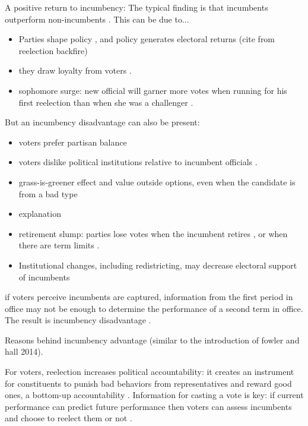\documentclass[12pt]{amsart}
\numberwithin{equation}{section}
\theoremstyle{definition}
\theoremstyle{definition}
\theoremstyle{definition}
\begin{document}
A positive return to incumbency:
The typical finding is that incumbents outperform non-incumbents \citep{gelman_king_1990, cox_morgensten_1993, ansolabehere_snyder_2000, hirano_snyder_2009}. This can be due to...
\begin{itemize}
	\item Parties shape policy \citep{cox_mccubins_1993, cox_mccubins_2006}, and policy generates electoral returns (cite from reelection backfire) 
	\item they draw loyalty from voters \citep{campbell_etal_1960, green_etal_2002}. 
	\item sophomore surge: new official will garner more votes when running for his first reelection than when she was a challenger \citep{erikson_1971, alford_brady_1989}.
\end{itemize}

But an incumbency disadvantage can also be present: 
\begin{itemize}
	\item voters prefer partisan balance \citep{campbell_miller_1957, lewis_beck_2004, folke_snyder_2012}
	\item voters dislike political institutions relative to incumbent officials \citep{fenno_1975, parker_davidson_1979}. 
	\item grass-is-greener effect and value outside options, even when the candidate is from a bad type \citep{brenner_etal_2007, bordalo_etal_2012, bhaia_turan_2013}
	\item \citep{klasnja_titiunik_2017} explanation
	\item retirement slump: parties lose votes when the incumbent retires \citep{alford_brady_1989}, or when there are term limits \citep{ansolabehere_snyder_2004}. 
	\item Institutional changes, including redistricting, may decrease electoral support of incumbents \citep{ansolabehere_etal_2000, desposato_petrocik_2003} 

\end{itemize} 

if voters perceive incumbents are captured, information from the first period in office may not be enough to determine the performance of a second term in office. The result is incumbency disadvantage \citep{weaver_2020}.

Reasons behind incumbency advantage (similar to the introduction of fowler and hall 2014). 

For voters, reelection increases political accountability: it creates an instrument for constituents to punish bad behaviors from  representatives and reward good ones, a bottom-up accountability \citep{mansbridge_2009}. Information for casting a vote is key: if current performance can predict future performance then voters can assess incumbents and choose to reelect them or not \citep{ashworth_2012}.  
\end{document}
